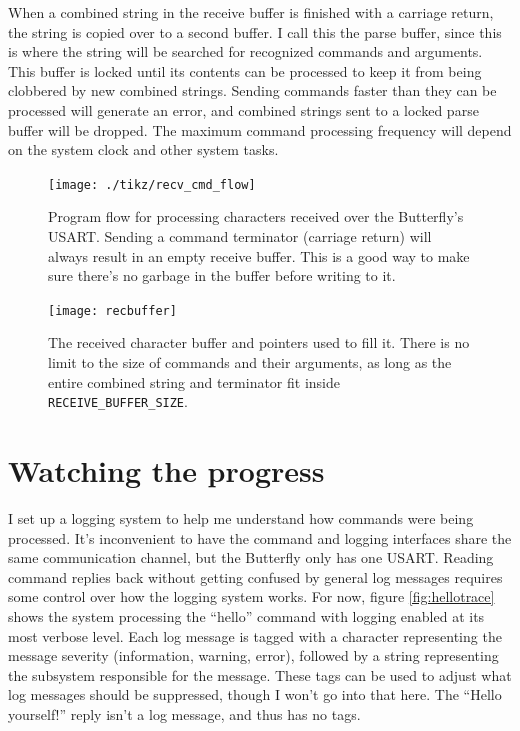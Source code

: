 When a combined string in the receive buffer is finished with a carriage return, the string is copied over to a second buffer.  I call this the parse buffer, since this is where the string will be searched for recognized commands and arguments.  This buffer is locked until its contents can be processed to keep it from being clobbered by new combined strings.  Sending commands faster than they can be processed will generate an error, and combined strings sent to a locked parse buffer will be dropped.  The maximum command processing frequency will depend on the system clock and other system tasks.  

\begin{figure}[ht]
    \begin{center}
        \texttt{[image: ./tikz/recv\_cmd\_flow]}
        \caption{Program flow for processing characters received over the Butterfly's USART.  Sending a command terminator (carriage return) will always result in an empty receive buffer.  This is a good way to make sure there's no garbage in the buffer before writing to it.\label{fig:recflow}}
    \end{center}
\end{figure}

\begin{figure}[ht]
    \begin{center}
        \texttt{[image: recbuffer]}
        \caption{The received character buffer and pointers used to fill it.  There is no limit to the size of commands and their arguments, as long as the entire combined string and terminator fit inside \texttt{RECEIVE\_BUFFER\_SIZE}.\label{fig:recbuffer}}
    \end{center}
\end{figure}

\clearpage{}
\section{Watching the progress}
I set up a logging system to help me understand how commands were being processed.  It's inconvenient to have the command and logging interfaces share the same communication channel, but the Butterfly only has one USART.  Reading command replies back without getting confused by general log messages requires some control over how the logging system works.  For now, figure \ref{fig:hellotrace} shows the system processing the ``hello'' command with logging enabled at its most verbose level.  Each log message is tagged with a character representing the message severity (information, warning, error), followed by a string representing the subsystem responsible for the message.  These tags can be used to adjust what log messages should be suppressed, though I won't go into that here.  The ``Hello yourself!'' reply isn't a log message, and thus has no tags.

